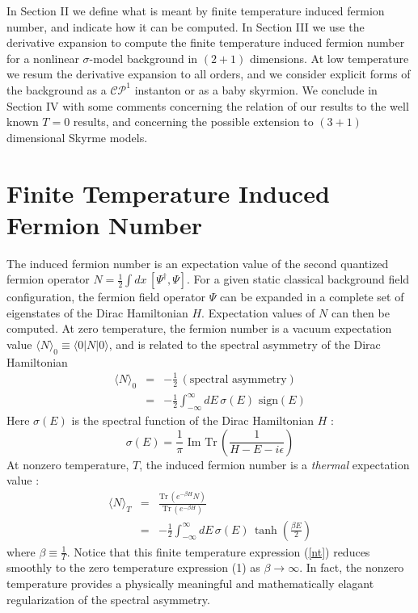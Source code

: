 \documentclass[a4paper,prd]{revtex4}
\begin{document}
In Section II we define what is meant by finite temperature induced fermion
number, and indicate how it can be computed. In Section III we use the derivative
expansion to compute the finite temperature induced fermion number for a nonlinear
$\sigma$-model background in $(2+1)$ dimensions. At low temperature we resum the
derivative  expansion to all orders, and we consider explicit forms of the background
as a $\mathcal{CP}^1$ instanton or as a baby skyrmion. We conclude in Section IV
with some comments concerning the relation of our results to the well
known $T=0$ results, and concerning the possible extension to $(3+1)$
dimensional Skyrme models.


\section{Finite Temperature Induced Fermion Number}

The induced fermion number is an expectation value of the second
quantized fermion operator $N=\frac{1}{2}\int
dx\,[\Psi^\dagger,\Psi]$.  For a given static classical background
field configuration, the fermion field operator $\Psi$ can be expanded
in a complete set of eigenstates of the Dirac Hamiltonian $H$. 
Expectation values of $N$ can then be computed. At zero temperature,
the fermion number is a vacuum expectation value
$\langle N\rangle_0\equiv\langle 0\vert N\vert 0
\rangle$, and is related to the spectral asymmetry of the Dirac
Hamiltonian \cite{niemi}
\begin{eqnarray}
\langle N\rangle_0&=&-\frac{1}{2}\,(\textrm{spectral asymmetry})\nonumber\\
&=&-\frac{1}{2}\int_{-\infty}^{\infty} dE \, \sigma(E)
\,\,\textrm{sign}(E)
\label{asymmetry}
\end{eqnarray}
Here $ \sigma (E)$ is the spectral function of the Dirac Hamiltonian
$H$ :
\begin{equation}
\sigma (E)=\frac{1}{\pi}\textrm{ Im Tr}
\,\left(\frac{1}{H-E-i\epsilon}\right)
\label{spectral}
\end{equation}
At nonzero temperature, $T$, the induced fermion number is a
{\it thermal} expectation value :
\begin{eqnarray}
\langle N\rangle_T &=&\frac{\textrm{Tr}\,(e^{-\beta
H}N)}{\textrm{Tr}\,(e^{-\beta H})}\nonumber\\
                   &=&-\frac{1}{2}\int_{-\infty}^{\infty}dE \,\sigma (E)
                   \,\tanh(\frac{\beta  E}{2})
\label{nt}
\end{eqnarray}
where $\beta \equiv \frac{1}{T}$. Notice that this finite temperature
expression (\ref{nt}) reduces smoothly to the zero temperature expression
(1) as $\beta\to \infty$. In fact, the nonzero temperature provides a
physically meaningful and mathematically elagant regularization of the
spectral asymmetry. 
\end{document}
